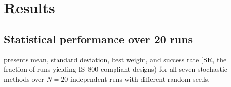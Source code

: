 \documentclass[lineno,pdflatex,sn-mathphys-num]{sn-jnl}
\begin{document}
\section{Results}
\label{sec:results}

\subsection{Statistical performance over 20 runs}

 presents mean, standard deviation, best weight,
and success rate (SR, the fraction of runs yielding IS~800-compliant
designs) for all seven stochastic methods over $N=20$ independent runs
with different random seeds.
\end{document}
